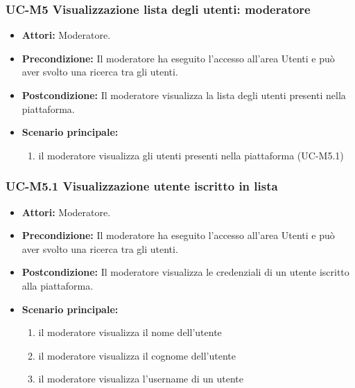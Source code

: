 \subsubsection{UC-M5 Visualizzazione lista degli utenti: moderatore}
	\begin{itemize}
		\item \textbf{Attori:} Moderatore.
		\item \textbf{Precondizione:} Il moderatore ha eseguito l'accesso all'area Utenti e può aver svolto una ricerca tra gli utenti.
		\item \textbf{Postcondizione:} Il moderatore visualizza la lista degli utenti presenti nella piattaforma.
		\item \textbf{Scenario principale:}
			\begin{enumerate}
				\item il moderatore visualizza gli utenti presenti nella piattaforma (UC-M5.1)
			\end{enumerate}
	\end{itemize}
	
\subsubsection{UC-M5.1 Visualizzazione utente iscritto in lista}
	\begin{itemize}
		\item \textbf{Attori:} Moderatore.
		\item \textbf{Precondizione:} Il moderatore ha eseguito l'accesso all'area Utenti e può aver svolto una ricerca tra gli utenti.
		\item \textbf{Postcondizione:} Il moderatore visualizza le credenziali di un utente iscritto alla piattaforma.
		\item \textbf{Scenario principale:}
			\begin{enumerate}
				\item il moderatore visualizza il nome dell'utente
				\item il moderatore visualizza il cognome dell'utente
				\item il moderatore visualizza l'username di un utente
			\end{enumerate}
	\end{itemize}
		
